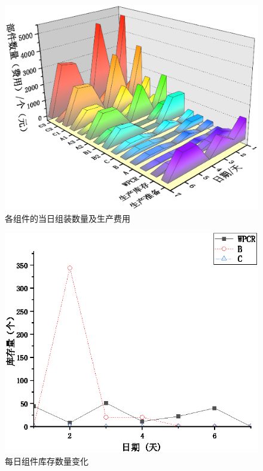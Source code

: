 \begin{figure}[!htbp]
	\centering
	\includegraphics{Image/问题一展示.eps}
	\caption{各组件的当日组装数量及生产费用}\label{各组件的当日组装数量及生产费用}
\end{figure}


\begin{figure}[!htbp]
	\centering
	\includegraphics{Image/问题一库存.eps}
	\caption{每日组件库存数量变化}\label{每日组件库存数量变化}
\end{figure}

